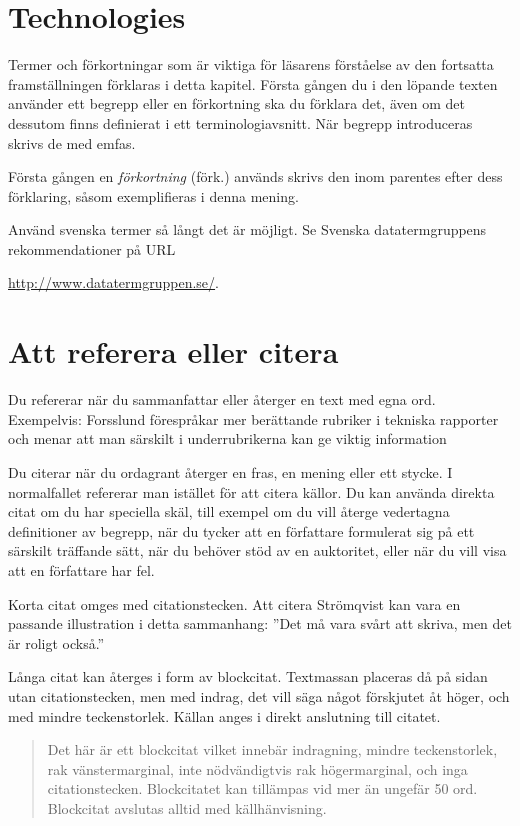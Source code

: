 \section{Technologies}
\label{sec:technologies}
\noindent

Termer och förkortningar som är viktiga för läsarens förståelse av den 
fortsatta framställningen förklaras i detta kapitel.
Första gången du i den löpande texten använder ett begrepp eller en förkortning 
ska du förklara det, även om det dessutom finns definierat i ett 
terminologiavsnitt.
När begrepp introduceras skrivs de med emfas.

Första gången en \emph{förkortning} (förk.) används skrivs den inom parentes 
efter dess förklaring, såsom exemplifieras i denna mening.

Använd svenska termer så långt det är möjligt.
Se Svenska datatermgruppens rekommendationer på URL
\begin{center}
	\url{http://www.datatermgruppen.se/}.
\end{center}


\section{Att referera eller citera}
\label{sec:ref}
\noindent
Du refererar när du sammanfattar eller återger en text med egna ord.
Exempelvis:
Forsslund förespråkar mer berättande rubriker i tekniska rapporter och menar 
att man särskilt i underrubrikerna kan ge viktig information 

Du citerar när du ordagrant återger en fras, en mening eller ett stycke.
I normalfallet refererar man istället för att citera källor.
Du kan använda direkta citat om du har speciella skäl, till exempel om du vill 
återge vedertagna definitioner av begrepp, när du tycker att en författare 
formulerat sig på ett särskilt träffande sätt, när du behöver stöd av en 
auktoritet, eller när du vill visa att en författare har fel.

Korta citat omges med citationstecken.
Att citera Strömqvist kan vara en passande illustration i detta sammanhang:
''Det må vara svårt att skriva, men det är roligt också.'' 

Långa citat kan återges i form av blockcitat.
Textmassan placeras då på sidan utan citationstecken, men med indrag, det vill 
säga något förskjutet åt höger, och med mindre teckenstorlek.
Källan anges i direkt anslutning till citatet.
\begin{quote}
	Det här är ett blockcitat vilket innebär indragning, mindre teckenstorlek, 
	rak vänstermarginal, inte nödvändigtvis rak högermarginal, och inga 
	citationstecken.
	Blockcitatet kan tillämpas vid mer än ungefär 50 ord.  Blockcitat avslutas 
	alltid med källhänvisning. 
\end{quote}

